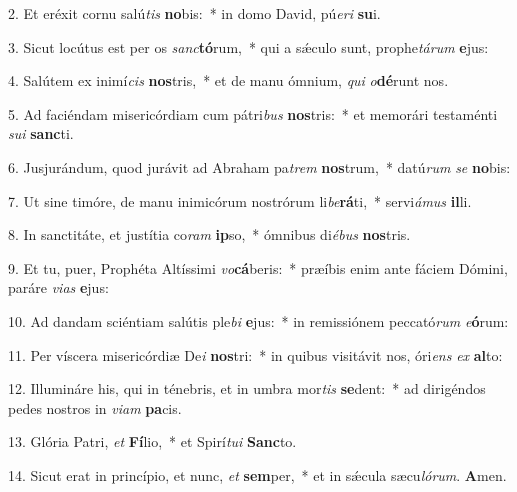 
2. Et eréxit cornu salú\textit{tis} \textbf{no}bis:~* in domo David, pú\textit{e}\textit{ri} \textbf{su}i.

3. Sicut locútus est per os \textit{sanc}\textbf{tó}rum,~* qui a s\'{\ae}culo sunt, prophe\textit{tá}\textit{rum} \textbf{e}jus:

4. Salútem ex inimí\textit{cis} \textbf{nos}tris,~* et de manu ómnium, \textit{qui} \textit{o}\textbf{dé}runt nos.

5. Ad faciéndam misericórdiam cum pátri\textit{bus} \textbf{nos}tris:~* et memorári testaménti \textit{su}\textit{i} \textbf{sanc}ti.

6. Jusjurándum, quod jurávit ad Abraham pa\textit{trem} \textbf{nos}trum,~* datú\textit{rum} \textit{se} \textbf{no}bis:

7. Ut sine timóre, de manu inimicórum nostrórum li\textit{be}\textbf{rá}ti,~* servi\textit{á}\textit{mus} \textbf{il}li.

8. In sanctitáte, et justítia co\textit{ram} \textbf{ip}so,~* ómnibus di\textit{é}\textit{bus} \textbf{nos}tris.

9. Et tu, puer, Prophéta Altíssimi \textit{vo}\textbf{cá}beris:~* præíbis enim ante fáciem Dómini, paráre \textit{vi}\textit{as} \textbf{e}jus:

10. Ad dandam sciéntiam salútis ple\textit{bi} \textbf{e}jus:~* in remissiónem peccató\textit{rum} \textit{e}\textbf{ó}rum:

11. Per víscera misericórdiæ De\textit{i} \textbf{nos}tri:~* in quibus visitávit nos, óri\textit{ens} \textit{ex} \textbf{al}to:

12. Illumináre his, qui in ténebris, et in umbra mor\textit{tis} \textbf{se}dent:~* ad dirigéndos pedes nostros in \textit{vi}\textit{am} \textbf{pa}cis.

13. Glória Patri, \textit{et} \textbf{Fí}lio,~* et Spirí\textit{tu}\textit{i} \textbf{Sanc}to.

14. Sicut erat in princípio, et nunc, \textit{et} \textbf{sem}per,~* et in s\'{\ae}cula sæcu\textit{ló}\textit{rum}. \textbf{A}men.